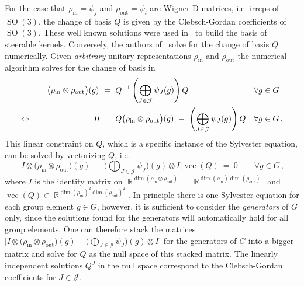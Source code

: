 \documentclass{article}
\newcommand{\lp}{\left(}
\newcommand{\rp}{\right)}
\DeclareMathOperator*{\R}{\mathbb{R}}
\newcommand{\SO}[1]{\ensuremath{\operatorname{SO}(#1)}}
\newcommand{\vc}[1]{\ensuremath{\operatorname{vec}\!\lp{#1}\rp}}
\begin{document}
For the case that $\rho_\text{in}=\psi_j$ and $\rho_\text{out}=\psi_l$ are Wigner D-matrices, i.e. irreps of $\SO3$, the change of basis $Q$ is given by the Clebsch-Gordan coefficients of $\SO3$.
These well known solutions were used in~\cite{TensorFieldNets,Kondor2018-NBN,kondorClebschGordanNets2018,anderson2019cormorant} to build the basis of steerable kernels.
Conversely, the authors of~\cite{3d_steerableCNNs} solve for the change of basis $Q$ numerically.
Given \textit{arbitrary} unitary representations $\rho_\text{in}$ and $\rho_\text{out}$ the numerical algorithm solves for the change of basis in
\begin{align*}
    \big(\rho_\text{in}\otimes\rho_\text{out}\big)(g)\ &=\ Q^{-1}\lp \bigoplus_{J\in\mathcal{J}}\psi_J(g)\rp Q &\forall& g\in G \\
    \Leftrightarrow \mkern140mu
    0\ &=\ Q\big(\rho_\text{in}\otimes\rho_\text{out}\big)(g)\ -\ \lp\bigoplus_{J\in\mathcal{J}}\psi_J(g)\rp Q &\forall& g\in G \,.
\end{align*}
This linear constraint on $Q$, which is a specific instance of the Sylvester equation, can be solved by vectorizing $Q$, i.e.
\[
    \Big[ I\otimes\big(\rho_\text{in}\otimes\rho_\text{out}\big)(g)\ -\ \Big(\!\bigoplus\nolimits_{J\in\mathcal{J}}\psi_J\Big)(g)\otimes I \Big] \vc{Q}\ =\ 0
    \qquad\forall g\in G \,,
\]
where $I$ is the identity matrix on $\R^{\dim(\rho_\text{in}\otimes\rho_\text{out})} = \R^{\dim(\rho_\text{in})\dim(\rho_\text{out})}$~and~${\vc{Q}\in\R^{\dim(\rho_\text{in})^2\dim(\rho_\text{out})^2}\!\!\!.}$
In principle there is one Sylvester equation for each group element $g\in G$, however, it is sufficient to consider the \textit{generators} of $G$ only, since the solutions found for the generators will automatically hold for all group elements.
One can therefore stack the matrices
${\Big[ I\otimes\big(\rho_\text{in}\otimes\rho_\text{out}\big)(g) - \Big(\!\bigoplus\nolimits_{J\in\mathcal{J}}\psi_J\Big)(g)\otimes I \Big]}$
for the generators of $G$ into a bigger matrix and solve for $Q$ as the null space of this stacked matrix.
The linearly independent solutions $Q^J$ in the null space correspond to the Clebsch-Gordan coefficients for $J\in\mathcal{J}$.
\end{document}
